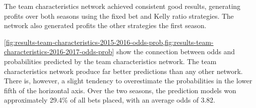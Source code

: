 The team characteristics network achieved consistent good results, generating profits over both seasons using the fixed bet and Kelly ratio strategies. The network also generated profits the other strategies the first season.

\cref{fig:results-team-characteristics-2015-2016-odds-prob,fig:results-team-characteristics-2016-2017-odds-prob} show the connection between odds and probabilities predicted by the team characteristics network. The team characteristics network produce far better predictions than any other network. There is, however, a slight tendency to overestimate the probabilities in the lower fifth of the horizontal axis. Over the two seasons, the prediction models won approximately 29.4\% of all bets placed, with an average odds of 3.82.